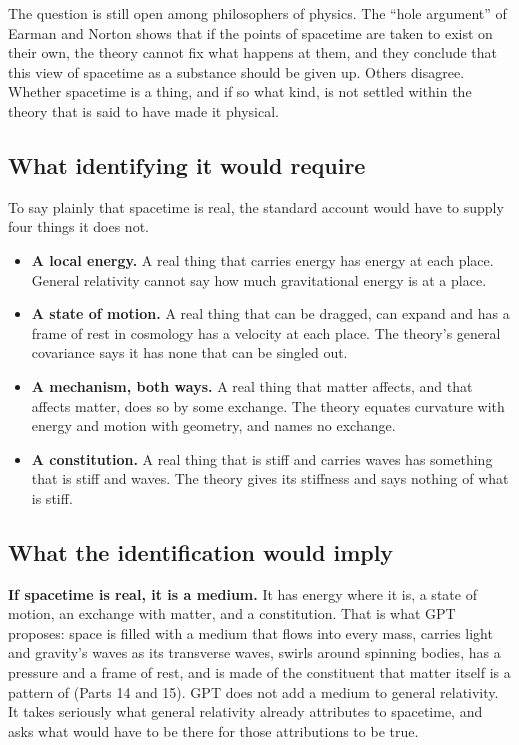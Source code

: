 The question is still open among philosophers of physics. The ``hole argument'' of Earman and Norton shows that if the points of spacetime are taken to exist on their own, the theory cannot fix what happens at them, and they conclude that this view of spacetime as a substance should be given up. Others disagree. Whether spacetime is a thing, and if so what kind, is not settled within the theory that is said to have made it physical.

\subsection{What identifying it would require}

To say plainly that spacetime is real, the standard account would have to supply four things it does not.
\begin{itemize}
\item \textbf{A local energy.} A real thing that carries energy has energy at each place. General relativity cannot say how much gravitational energy is at a place.
\item \textbf{A state of motion.} A real thing that can be dragged, can expand and has a frame of rest in cosmology has a velocity at each place. The theory's general covariance says it has none that can be singled out.
\item \textbf{A mechanism, both ways.} A real thing that matter affects, and that affects matter, does so by some exchange. The theory equates curvature with energy and motion with geometry, and names no exchange.
\item \textbf{A constitution.} A real thing that is stiff and carries waves has something that is stiff and waves. The theory gives its stiffness and says nothing of what is stiff.
\end{itemize}

\subsection{What the identification would imply}

\begin{hypbar}
\textbf{If spacetime is real, it is a medium.} It has energy where it is, a state of motion, an exchange with matter, and a constitution. That is what GPT proposes: space is filled with a medium that flows into every mass, carries light and gravity's waves as its transverse waves, swirls around spinning bodies, has a pressure and a frame of rest, and is made of the constituent that matter itself is a pattern of (Parts 14 and 15).\footnotemark{} GPT does not add a medium to general relativity. It takes seriously what general relativity already attributes to spacetime, and asks what would have to be there for those attributions to be true.
\end{hypbar}

